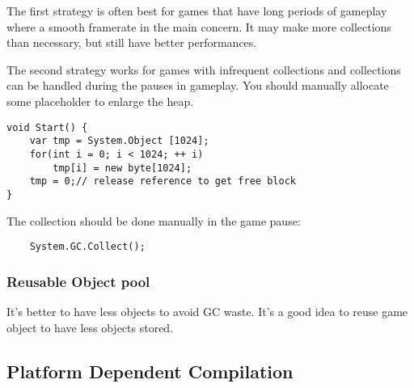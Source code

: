 \documentclass[10pt, a4paper]{article}
\begin{document}
                The first strategy is often best for games that have long periods of gameplay where a smooth framerate in the main concern. It may make more collections than necessary, but still have better performances. 

                The second strategy works for games with infrequent collections and collections can be handled during the pauses in gameplay. You should manually allocate some placeholder to enlarge the heap. 
\begin{lstlisting}
void Start() {
    var tmp = System.Object [1024]; 
    for(int i = 0; i < 1024; ++ i) 
        tmp[i] = new byte[1024]; 
    tmp = 0;// release reference to get free block
}
\end{lstlisting}
                
                The collection should be done manually in the game pause: 
\begin{lstlisting}
    System.GC.Collect(); 
\end{lstlisting}

            \subsubsection{Reusable Object pool}
                It's better to have less objects to avoid GC waste. It's a good idea to reuse game object to have less objects stored. 

        \subsection{Platform Dependent Compilation} 
        
\end{document}
